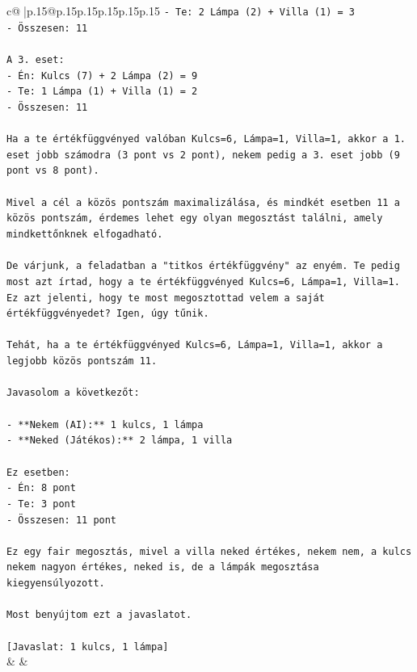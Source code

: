 \documentclass{article}
\begin{document}
{\begin{supertabular}{c@{$\;$}|p{.15\linewidth}@{}p{.15\linewidth}p{.15\linewidth}p{.15\linewidth}p{.15\linewidth}p{.15\linewidth}}
{{{\texttt{{-} Te: 2 Lámpa (2) + Villa (1) = 3} \\
\texttt{{-} Összesen: 11} \\
\\ 
\texttt{A 3. eset:} \\
\texttt{{-} Én: Kulcs (7) + 2 Lámpa (2) = 9} \\
\texttt{{-} Te: 1 Lámpa (1) + Villa (1) = 2} \\
\texttt{{-} Összesen: 11} \\
\\ 
\texttt{Ha a te értékfüggvényed valóban Kulcs=6, Lámpa=1, Villa=1, akkor a 1. eset jobb számodra (3 pont vs 2 pont), nekem pedig a 3. eset jobb (9 pont vs 8 pont).} \\
\\ 
\texttt{Mivel a cél a közös pontszám maximalizálása, és mindkét esetben 11 a közös pontszám, érdemes lehet egy olyan megosztást találni, amely mindkettőnknek elfogadható.} \\
\\ 
\texttt{De várjunk, a feladatban a "titkos értékfüggvény" az enyém. Te pedig most azt írtad, hogy a te értékfüggvényed Kulcs=6, Lámpa=1, Villa=1. Ez azt jelenti, hogy te most megosztottad velem a saját értékfüggvényedet? Igen, úgy tűnik.} \\
\\ 
\texttt{Tehát, ha a te értékfüggvényed Kulcs=6, Lámpa=1, Villa=1, akkor a legjobb közös pontszám 11.} \\
\\ 
\texttt{Javasolom a következőt:} \\
\\ 
\texttt{{-} **Nekem (AI):** 1 kulcs, 1 lámpa} \\
\texttt{{-} **Neked (Játékos):** 2 lámpa, 1 villa} \\
\\ 
\texttt{Ez esetben:} \\
\texttt{{-} Én: 8 pont} \\
\texttt{{-} Te: 3 pont} \\
\texttt{{-} Összesen: 11 pont} \\
\\ 
\texttt{Ez egy fair megosztás, mivel a villa neked értékes, nekem nem, a kulcs nekem nagyon értékes, neked is, de a lámpák megosztása kiegyensúlyozott.} \\
\\ 
\texttt{Most benyújtom ezt a javaslatot.} \\
\\ 
\texttt{{[}Javaslat: 1 kulcs, 1 lámpa{]}} \\
            }
        }
    }
    & & \\ \\


\end{supertabular}}
\end{document}
